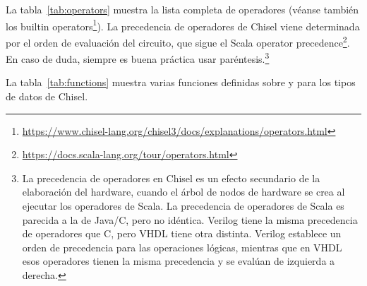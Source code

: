 \documentclass[%
    10pt,
    headinclude, footinclude=false,
    openright, %
    notitlepage,
    cleardoublepage=empty,
    headsepline,
    numbers=noenddot,
    bibliography=totoc, index=totoc,
    ]{scrbook}
\newcommand{\code}[1]{{\lstinline[basicstyle=\small\ttfamily]{#1}}}
\newcommand{\myref}[2]{\href{#1}{#2}}
\renewcommand{\myref}[2]{{#2}{\footnote{\url{#1}}}}
\begin{document}
La tabla~\ref{tab:operators} muestra la lista completa de operadores
(véanse también los \myref{https://www.chisel-lang.org/chisel3/docs/explanations/operators.html}{builtin operators}).
La precedencia de operadores de Chisel viene determinada por el orden de evaluación del circuito,
que sigue el \myref{https://docs.scala-lang.org/tour/operators.html}{Scala operator precedence}.
En caso de duda, siempre es buena práctica usar paréntesis.\footnote{La precedencia de operadores en
Chisel es un efecto secundario de la elaboración del hardware, cuando el árbol de nodos de hardware
se crea al ejecutar los operadores de Scala. La precedencia de operadores de Scala es parecida a la de
Java/C, pero no idéntica. Verilog tiene la misma precedencia de operadores que C, pero VHDL
tiene otra distinta. Verilog establece un orden de precedencia para las operaciones lógicas, mientras que en VHDL
esos operadores tienen la misma precedencia y se evalúan de izquierda a derecha.}

La tabla~\ref{tab:functions} muestra varias funciones definidas sobre y para los tipos de datos de Chisel.

\end{document}
